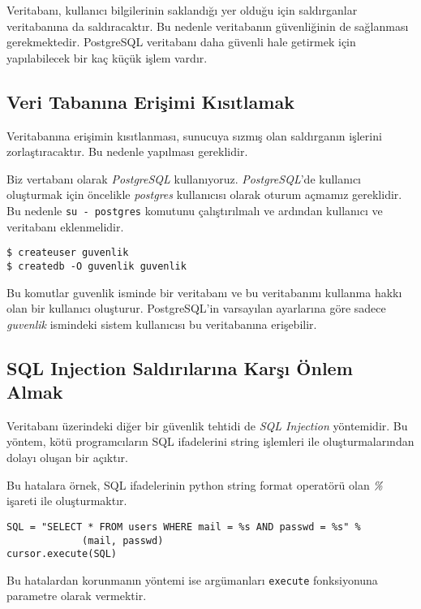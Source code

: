 \documentclass[11pt]{report}
\begin{document}
Veritabanı, kullanıcı bilgilerinin saklandığı yer olduğu için saldırganlar veritabanına da saldıracaktır. Bu nedenle veritabanın güvenliğinin de sağlanması gerekmektedir. PostgreSQL veritabanı daha güvenli hale getirmek için yapılabilecek bir kaç küçük işlem vardır.

\subsection{Veri Tabanına Erişimi Kısıtlamak}

Veritabanına erişimin kısıtlanması, sunucuya sızmış olan saldırganın işlerini zorlaştıracaktır. Bu nedenle yapılması gereklidir.

Biz vertabanı olarak \emph{PostgreSQL} kullanıyoruz. \emph{PostgreSQL}'de kullanıcı oluşturmak için öncelikle \emph{postgres} kullanıcısı olarak oturum açmamız gereklidir. Bu nedenle \texttt{su - postgres} komutunu çalıştırılmalı ve ardından kullanıcı ve veritabanı eklenmelidir.

\begin{lstlisting}[caption=PostgreSQL Kullanıcı ve Verıtabanı Ekleme]
$ createuser guvenlik
$ createdb -O guvenlik guvenlik
\end{lstlisting}

Bu komutlar guvenlik isminde bir veritabanı ve bu veritabanını kullanma hakkı olan bir kullanıcı oluşturur. PostgreSQL'in varsayılan ayarlarına göre sadece \emph{guvenlik} ismindeki sistem kullanıcısı bu veritabanına erişebilir.

\subsection{SQL Injection Saldırılarına Karşı Önlem Almak}

Veritabanı üzerindeki diğer bir güvenlik tehtidi de \emph{SQL Injection} yöntemidir. Bu yöntem, kötü programcıların SQL ifadelerini string işlemleri ile oluşturmalarından dolayı oluşan bir açıktır.

Bu hatalara örnek, SQL ifadelerinin python string format operatörü olan \emph{\%} işareti ile oluşturmaktır.

\begin{lstlisting}[caption=Python-psycopg2 SQL Injection]
SQL = "SELECT * FROM users WHERE mail = %s AND passwd = %s" %
             (mail, passwd)
cursor.execute(SQL)
\end{lstlisting}

Bu hatalardan korunmanın yöntemi ise argümanları \texttt{execute} fonksiyonuna parametre olarak vermektir.
\end{document}
